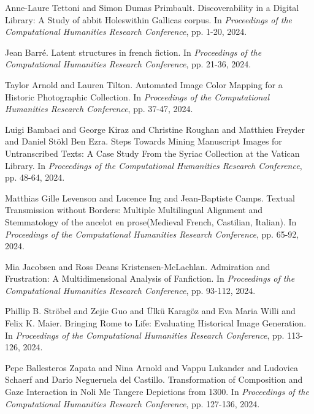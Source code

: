 \begin{thebibliography}{99}
 Anne-Laure Tettoni and Simon Dumas Primbault. {D}iscoverability in a {D}igital {L}ibrary: {A} Study of \textasciigrave {}abbit {H}oles\textquotesingle \textquotesingle  within {G}allica\textquotesingle s corpus. In \textit{Proceedings of the Computational Humanities Research Conference}, pp. 1-20, 2024.

 Jean Barr{\'e}. {L}atent structures in french fiction. In \textit{Proceedings of the Computational Humanities Research Conference}, pp. 21-36, 2024.

 Taylor Arnold and Lauren Tilton. {A}utomated {I}mage {C}olor {M}apping for a {H}istoric {P}hotographic {C}ollection. In \textit{Proceedings of the Computational Humanities Research Conference}, pp. 37-47, 2024.

 Luigi Bambaci and George Kiraz and Christine Roughan and Matthieu Freyder and Daniel St{\"o}kl Ben Ezra. {S}teps {T}owards {M}ining {M}anuscript {I}mages for {U}ntranscribed {T}exts: {A} Case {S}tudy {F}rom the {S}yriac {C}ollection at the {V}atican {L}ibrary. In \textit{Proceedings of the Computational Humanities Research Conference}, pp. 48-64, 2024.

 Matthias Gille Levenson and Lucence Ing and Jean-Baptiste Camps. {T}extual {T}ransmission without {B}orders: {M}ultiple {M}ultilingual {A}lignment and {S}temmatology of the \textasciigrave {}ancelot en prose\textquotesingle \textquotesingle  ({M}edieval {F}rench, {C}astilian, {I}talian). In \textit{Proceedings of the Computational Humanities Research Conference}, pp. 65-92, 2024.

 Mia Jacobsen and Ross Deans Kristensen-McLachlan. {A}dmiration and {F}rustration: {A} Multidimensional {A}nalysis of {F}anfiction. In \textit{Proceedings of the Computational Humanities Research Conference}, pp. 93-112, 2024.

 Phillip B. Str{\"o}bel and Zejie Guo and {\"U}lk{\"u} Karag{\"o}z and Eva Maria Willi and Felix K. Maier. {B}ringing {R}ome to {L}ife: {E}valuating {H}istorical {I}mage {G}eneration. In \textit{Proceedings of the Computational Humanities Research Conference}, pp. 113-126, 2024.

 Pepe Ballesteros Zapata and Nina Arnold and Vappu Lukander and Ludovica Schaerf and Dario Negueruela del Castillo. {T}ransformation of {C}omposition and {G}aze {I}nteraction in {N}oli {M}e {T}angere {D}epictions from 1300. In \textit{Proceedings of the Computational Humanities Research Conference}, pp. 127-136, 2024.


\end{thebibliography}
